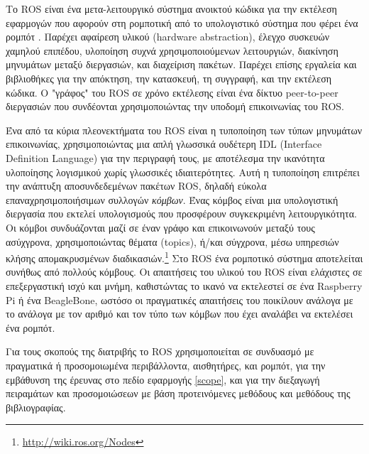 Το ROS είναι ένα μετα-λειτουργικό σύστημα ανοικτού κώδικα για την εκτέλεση
εφαρμογών που αφορούν στη ρομποτική από το υπολογιστικό σύστημα που φέρει ένα
ρομπότ \cite{Ng2009}. Παρέχει αφαίρεση υλικού (hardware abstraction), έλεγχο
συσκευών χαμηλού επιπέδου, υλοποίηση συχνά χρησιμοποιούμενων λειτουργιών,
διακίνηση μηνυμάτων μεταξύ διεργασιών, και διαχείριση πακέτων. Παρέχει επίσης
εργαλεία και βιβλιοθήκες για την απόκτηση, την κατασκευή, τη συγγραφή, και την
εκτέλεση κώδικα. Ο "γράφος" του ROS σε χρόνο εκτέλεσης είναι ένα δίκτυο
peer-to-peer διεργασιών που συνδέονται χρησιμοποιώντας την υποδομή επικοινωνίας
του ROS.

Ένα από τα κύρια πλεονεκτήματα του ROS είναι η τυποποίηση των τύπων μηνυμάτων
επικοινωνίας, χρησιμοποιώντας μια απλή γλωσσικά ουδέτερη IDL (Interface
Definition Language) για την περιγραφή τους, με αποτέλεσμα την ικανότητα
υλοποίησης λογισμικού χωρίς γλωσσικές ιδιαιτερότητες. Αυτή η τυποποίηση
επιτρέπει την ανάπτυξη αποσυνδεδεμένων πακέτων ROS, δηλαδή εύκολα
επαναχρησιμοποιήσιμων συλλογών \textit{κόμβων}. Ένας κόμβος είναι μια
υπολογιστική διεργασία που εκτελεί υπολογισμούς που προσφέρουν συγκεκριμένη
λειτουργικότητα. Οι κόμβοι συνδυάζονται μαζί σε έναν γράφο και επικοινωνούν
μεταξύ τους ασύχγρονα, χρησιμοποιώντας θέματα (topics), ή/και σύγχρονα, μέσω
υπηρεσιών κλήσης απομακρυσμένων
διαδικασιών.\footnote{\url{http://wiki.ros.org/Nodes}} Στο ROS ένα ρομποτικό
σύστημα αποτελείται συνήθως από πολλούς κόμβους.  Οι απαιτήσεις του υλικού του
ROS είναι ελάχιστες σε επεξεργαστική ισχύ και μνήμη, καθιστώντας το ικανό να
εκτελεστεί σε ένα Raspberry Pi ή ένα BeagleBone, ωστόσο οι πραγματικές
απαιτήσεις του ποικίλουν ανάλογα με το ανάλογα με τον αριθμό και τον τύπο των
κόμβων που έχει αναλάβει να εκτελέσει ένα ρομπότ.

Για τους σκοπούς της διατριβής το ROS χρησιμοποιείται σε συνδυασμό με πραγματικά
ή προσομοιωμένα περιβάλλοντα, αισθητήρες, και ρομπότ, για την εμβάθυνση
της έρευνας στο πεδίο εφαρμογής \ref{scope}, και για την διεξαγωγή πειραμάτων
και προσομοιώσεων με βάση προτεινόμενες μεθόδους και μεθόδους της βιβλιογραφίας.
